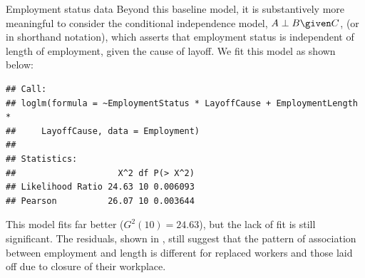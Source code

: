 \documentclass[11pt]{book}
\renewenvironment{knitrout}{\small\renewcommand{\baselinestretch}{.85}}{} %
\begin{document}
\begin{Example}[employ]{Employment status data}
Beyond this baseline model, it is substantively more meaningful to consider the 
conditional independence model, \(A \perp B \given C\),
(or  in shorthand notation), which asserts that
employment status is independent of length of employment, given the cause of layoff.
We fit this model as shown below:
\begin{knitrout}
\color{fgcolor}\begin{kframe}
\begin{alltt}
\hlstd{(}\hlopt{~} \hlopt{*} \hlopt{+} \hlopt{*}
\end{alltt}
\begin{verbatim}
## Call:
## loglm(formula = ~EmploymentStatus * LayoffCause + EmploymentLength * 
##     LayoffCause, data = Employment)
## 
## Statistics:
##                    X^2 df P(> X^2)
## Likelihood Ratio 24.63 10 0.006093
## Pearson          26.07 10 0.003644
\end{verbatim}
\end{kframe}
\end{knitrout}
This model fits far better (\(G^2 (10) = 24.63\)),
but the lack of fit is still significant.
The residuals, shown in , still
suggest that the pattern of association between employment and length
is different for replaced workers and those laid off due to closure of their workplace.

\begin{knitrout}
\color{fgcolor}\begin{kframe}
\begin{alltt}
 \hlstd{=}\hlstd{,} \hlstd{=}\hlstd{(}\hlstd{=}\hlopt{:}\hlstd{),}
        \hlstd{=} \hlopt{~} \hlopt{*} \hlopt{+} \hlopt{*}
        \hlstd{=} \hlstd{)}
\end{alltt}
\end{kframe}\begin{figure}[!htbp]



\end{figure}
\end{knitrout}
\end{Example}
\end{document}
